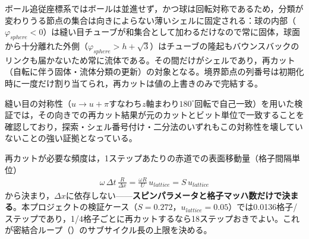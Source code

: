 ボール追従座標系ではボールは並進せず，かつ球は回転対称であるため，分類が変わりうる節点の集合は向きによらない薄いシェルに固定される：球の内部（\(\varphi_{sphere}<0\)）は縫い目チューブが和集合として加わるだけなので常に固体，球面から十分離れた外側（\(\varphi_{sphere}>h+\sqrt3\)）はチューブの隆起もバウンスバックのリンクも届かないため常に流体である。その間だけがシェルであり，再カット（自転に伴う固体・流体分類の更新）の対象となる。境界節点の列番号は初期化時に一度だけ割り当てられ，再カットは値の上書きのみで完結する。

縫い目の対称性（\(u\to u+\pi\)すなわち\(z\)軸まわり\(180^\circ\)回転で自己一致）を用いた検証では，その向きでの再カット結果が元のカットとビット単位で一致することを確認しており，探索・シェル番号付け・二分法のいずれもこの対称性を壊していないことの強い証拠となっている。

再カットが必要な頻度は，1ステップあたりの赤道での表面移動量（格子間隔単位）
\begin{align}
	\omega\,\Delta t\,\frac{R}{\Delta x} = \frac{\omega R}{U}\,u_{lattice} = S\,u_{lattice}
	\label{eq:recut-rate}
\end{align}
から決まり，\(\Delta x\)に依存しない——\textbf{スピンパラメータと格子マッハ数だけで決まる}。本プロジェクトの検証ケース（\(S=0.272\)，\(u_{lattice}=0.05\)）では0.0136格子/ステップであり，1/4格子ごとに再カットするなら18ステップおきでよい。これが密結合ループ（）のサブサイクル長の上限を決める。
